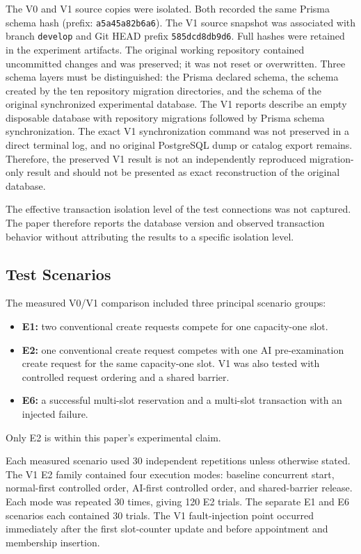 \documentclass[conference]{IEEEtran}
\begin{document}
The V0 and V1 source copies were isolated. Both recorded the same Prisma schema hash (prefix: \texttt{a5a45a82b6a6}). The V1 source snapshot was associated with branch \texttt{develop} and Git HEAD prefix \texttt{585dcd8db9d6}. Full hashes were retained in the experiment artifacts. The original working repository contained uncommitted changes and was preserved; it was not reset or overwritten. Three schema layers must be distinguished: the Prisma declared schema, the schema created by the ten repository migration directories, and the schema of the original synchronized experimental database. The V1 reports describe an empty disposable database with repository migrations followed by Prisma schema synchronization. The exact V1 synchronization command was not preserved in a direct terminal log, and no original PostgreSQL dump or catalog export remains. Therefore, the preserved V1 result is not an independently reproduced migration-only result and should not be presented as exact reconstruction of the original database.

The effective transaction isolation level of the test connections was not captured. The paper therefore reports the database version and observed transaction behavior without attributing the results to a specific isolation level.

\subsection{Test Scenarios}
The measured V0/V1 comparison included three principal scenario groups:
\begin{itemize}
  \item \textbf{E1:} two conventional create requests compete for one capacity-one slot.
  \item \textbf{E2:} one conventional create request competes with one AI pre-examination create request for the same capacity-one slot. V1 was also tested with controlled request ordering and a shared barrier.
  \item \textbf{E6:} a successful multi-slot reservation and a multi-slot transaction with an injected failure.
\end{itemize}
Only E2 is within this paper's experimental claim.

Each measured scenario used 30 independent repetitions unless otherwise stated. The V1 E2 family contained four execution modes: baseline concurrent start, normal-first controlled order, AI-first controlled order, and shared-barrier release. Each mode was repeated 30 times, giving 120 E2 trials. The separate E1 and E6 scenarios each contained 30 trials. The V1 fault-injection point occurred immediately after the first slot-counter update and before appointment and membership insertion.
\end{document}
